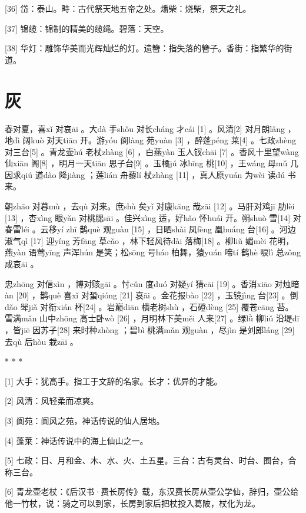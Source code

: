 \documentclass[12pt,UTF8]{ctexbook}
\begin{document}
[36] 岱：泰山。畤：古代祭天地五帝之处。燔柴：烧柴，祭天之礼。

[37] 锦缆：锦制的精美的缆绳。碧落：天空。

[38] 华灯：雕饰华美而光辉灿烂的灯。遗簪：指失落的簪子。香街：指繁华的街道。





\chapter{灰}


春对夏，喜xǐ 对哀āi 。大dà 手shǒu 对长cháng 才cái [1] 。风清[2] 对月朗lǎng ，地dì 阔kuò 对天tiān 开。游yóu 阆làng 苑yuàn [3] ，醉蓬péng 莱[4] 。七政zhèng 对三台[5] 。青龙壶hú 老杖zhàng [6] ，白燕yàn 玉人钗chāi [7] 。香风十里望wàng 仙xiān 阁[8] ，明月一天tiān 思子台[9] 。玉橘jú 冰bīng 桃[10] ，王wáng 母mǔ 几因求qiú 道dào 降jiàng ；莲lián 舟藜lí 杖zhàng [11] ，真人原yuán 为wèi 读dú 书来。

朝zhāo 对暮mù ，去qù 对来。庶shù 矣yǐ 对康kāng 哉zāi [12] 。马肝对鸡jī 肋lèi [13] ，杏xìng 眼yǎn 对桃腮sāi 。佳兴xìng 适，好hǎo 怀huái 开。朔shuò 雪[14] 对春雷léi 。云移yí zhī 鹊què 观guàn [15] ，日晒shài 凤fèng 凰huáng 台[16] 。河边淑气qì [17] 迎yíng 芳fāng 草cǎo ，林下轻风待dài 落梅[18] 。柳liǔ 媚mèi 花明，燕yàn 语莺yīng 声浑hún 是笑；松sōng 号háo 柏舞，猿yuán 啼tí 鹤hè 唳lì 总zǒng 成哀āi 。

忠zhōng 对信xìn ，博对赅gāi 。忖cǔn 度duó 对疑yí 猜cāi [19] 。香消xiāo 对烛暗àn [20] ，鹊què 喜xǐ 对蛩qióng [21] 哀āi 。金花报bào [22] ，玉镜jìng 台[23] 。倒dǎo 斝jiǎ 对衔xián 杯[24] 。岩巅diān 横老树shù ，石磴dèng [25] 覆苍cāng 苔。雪满mǎn 山中zhōng 高士卧wò [26] ，月明林下美měi 人来[27] 。绿lǜ 柳liǔ 沿堤dī ，皆jiē 因苏子[28] 来时种zhòng ；碧bì 桃满mǎn 观guàn ，尽jìn 是刘郎láng [29] 去qù 后hòu 栽zāi 。



* * *



[1] 大手：犹高手。指工于文辞的名家。长才：优异的才能。

[2] 风清：风轻柔而凉爽。

[3] 阆苑：阆风之苑，神话传说的仙人居地。

[4] 蓬莱：神话传说中的海上仙山之一。

[5] 七政：日、月和金、木、水、火、土五星。三台：古有灵台、时台、囿台，合称三台。

[6] 青龙壶老杖：《后汉书·费长房传》载，东汉费长房从壶公学仙，辞归，壶公给他一竹杖，说：骑之可以到家，长房到家后把杖投入葛陂，杖化为龙。
\end{document}
